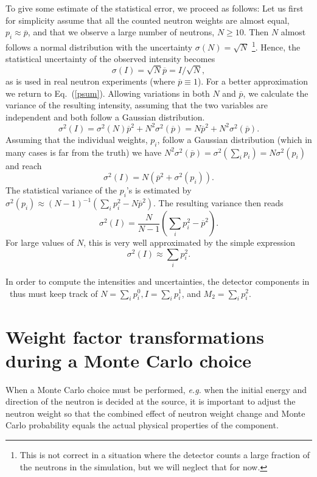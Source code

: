 To give some estimate of the statistical error, we proceed as follows:
Let us first for simplicity assume that all the counted neutron weights are
almost equal, $p_i \approx \overline{p}$,
and that we observe a large number of neutrons, $N \geq 10$.
Then $N$ almost follows a normal distribution
with the uncertainty $\sigma(N) = \sqrt{N}$
\footnote{This is not correct in a
situation where the detector counts a large fraction of the
neutrons in the simulation, but we will neglect that for now.}.
Hence, the statistical uncertainty of the observed intensity becomes
\begin{equation}
 \sigma(I) = \sqrt{N} \overline{p} = I / \sqrt{N} ,
\end{equation}
as is used in real neutron experiments (where $\overline{p} \equiv 1$).
For a better approximation we return to Eq.~(\ref{psum}).
Allowing variations in both $N$ and $\overline{p}$,
we calculate the variance of the resulting intensity,
assuming that the two variables are independent and both follow
a Gaussian distribution.
\begin{equation}
\sigma^2(I) = \sigma^2(N) \overline{p}^2 + N^2 \sigma^2(\overline{p})
            = N \overline{p}^2 + N^2 \sigma^2(\overline{p}) .
\end{equation}
Assuming that the individual weights, $p_i$, follow a Gaussian distribution
(which in many cases is far from the truth)
we have $N^2 \sigma^2(\overline{p}) = \sigma^2(\sum_i p_i) = N
\sigma^2(p_i)$
and reach
\begin{equation}
\sigma^2(I) = N \left( \overline{p}^2 + \sigma^2(p_i) \right).
\end{equation}
The statistical variance of the $p_i$'s is estimated by
$\sigma^2(p_i) \approx (N-1)^{-1} (\sum_i p_i^2 - N \overline{p}^2)$.
The resulting variance then reads
\begin{equation}
\sigma^2(I) = \frac{N}{N-1} \left( \sum_i p_i^2 - \overline{p}^2  \right) .
\end{equation}
For large values of $N$, this is very well approximated
by the simple expression
\begin{equation}
\sigma^2(I) \approx \sum_i p_i^2 .
\end{equation}

In order to compute the intensities and uncertainties, the detector components
in \MCS\ thus must keep track of
$N=\sum_i p_i^0, I=\sum_i p_i^1$, and $M_2 = \sum_i p_i^2$.

\section{Weight factor transformations during a Monte Carlo
 choice}
When a Monte Carlo choice must be performed, {\em e.g.} when the
initial energy and direction of the neutron is decided at the source,
it is important to adjust the neutron weight so that the combined
effect of neutron weight change and Monte Carlo probability
equals the actual physical properties of the component.

